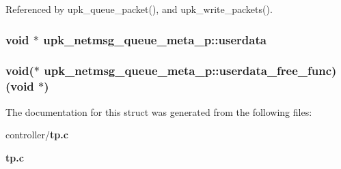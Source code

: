 Referenced by upk\_\-queue\_\-packet(), and upk\_\-write\_\-packets().

\subsubsection[{userdata}]{\setlength{\rightskip}{0pt plus 5cm}void $\ast$ {\bf upk\_\-netmsg\_\-queue\_\-meta\_\-p::userdata}}\label{structupk__netmsg__queue__meta__p_a6dd531e1469b7de929051d04e71accac}
\subsubsection[{userdata\_\-free\_\-func}]{\setlength{\rightskip}{0pt plus 5cm}void($\ast$ {\bf upk\_\-netmsg\_\-queue\_\-meta\_\-p::userdata\_\-free\_\-func})(void $\ast$)}\label{structupk__netmsg__queue__meta__p_aa2c77e0e47f00d37e23699de9bbcc74e}


The documentation for this struct was generated from the following files:\begin{DoxyCompactItemize}
\item 
controller/{\bf tp.c}\item 
{\bf tp.c}\end{DoxyCompactItemize}
